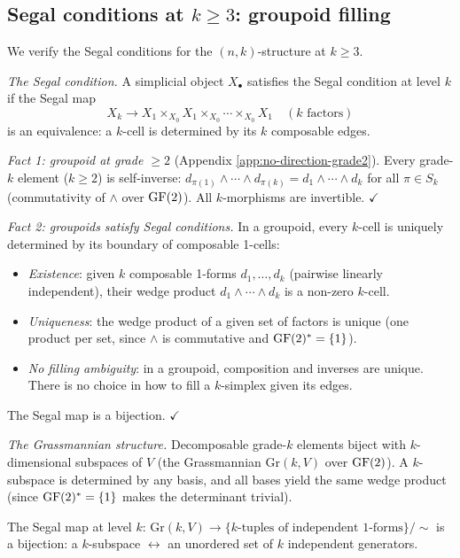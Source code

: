\subsection{Segal conditions at $k \geq 3$: groupoid
  filling}
\label{app:segal}

We verify the Segal conditions for the $(n,k)$-structure
at $k \geq 3$.

\emph{The Segal condition.}
A simplicial object $X_\bullet$ satisfies the Segal
condition at level $k$ if the Segal map
\[
  X_k \to X_1 \times_{X_0} X_1 \times_{X_0}
  \cdots \times_{X_0} X_1 \quad (k \text{ factors})
\]
is an equivalence: a $k$-cell is determined by its
$k$ composable edges.

\emph{Fact 1: groupoid at grade $\geq 2$}
(Appendix \ref{app:no-direction-grade2}).
Every grade-$k$ element ($k \geq 2$) is self-inverse:
$d_{\pi(1)} \wedge \cdots \wedge d_{\pi(k)} =
d_1 \wedge \cdots \wedge d_k$ for all $\pi \in S_k$
(commutativity of $\wedge$ over $\operatorname{GF}(2)$). All
$k$-morphisms are invertible. $\checkmark$

\emph{Fact 2: groupoids satisfy Segal conditions.}
In a groupoid, every $k$-cell is uniquely determined
by its boundary of composable 1-cells:
\begin{itemize}[nosep]
  \item \emph{Existence}: given $k$ composable 1-forms
    $d_1, \ldots, d_k$ (pairwise linearly independent),
    their wedge product $d_1 \wedge \cdots \wedge d_k$
    is a non-zero $k$-cell.
  \item \emph{Uniqueness}: the wedge product of a given
    set of factors is unique (one product per set, since
    $\wedge$ is commutative and $\operatorname{GF}(2)^* = \{1\}$).
  \item \emph{No filling ambiguity}: in a groupoid,
    composition and inverses are unique. There is no
    choice in how to fill a $k$-simplex given its edges.
\end{itemize}
The Segal map is a bijection. $\checkmark$

\emph{The Grassmannian structure.}
Decomposable grade-$k$ elements biject with
$k$-dimensional subspaces of $V$ (the Grassmannian
$\mathrm{Gr}(k, V)$ over $\operatorname{GF}(2)$). A $k$-subspace
is determined by any basis, and all bases yield the
same wedge product (since $\operatorname{GF}(2)^* = \{1\}$ makes
the determinant trivial).

The Segal map at level $k$:
$\mathrm{Gr}(k, V) \to \{\text{$k$-tuples of independent
1-forms}\}/\sim$
is a bijection: a $k$-subspace $\leftrightarrow$ an
unordered set of $k$ independent generators.

